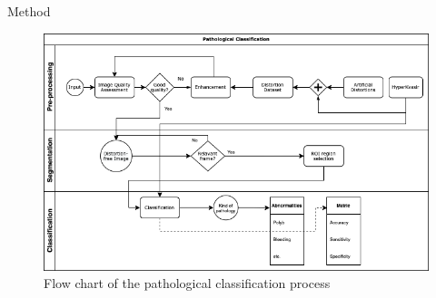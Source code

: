 \documentclass{libs/ufc_format}
\newcommand{\tikzmark}[1]{\tikz[overlay,remember picture] \node (#1) {};}
\begin{document}






\begin{frame}{Method}
    \begin{figure}
        \centering
        \includegraphics[scale=0.4]{libs/algorithm.png}
        \caption{ Flow chart of the pathological classification process}
        \label{fig:al}
    \end{figure}
\end{frame}
\end{document}
